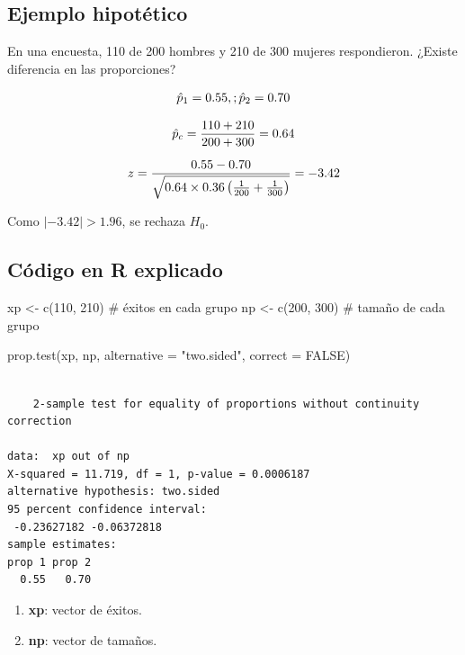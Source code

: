 \documentclass[
  spanish,
  letterpaper,
]{book}
\newenvironment{Shaded}{\begin{snugshade}}{\end{snugshade}}
\newcommand{\AttributeTok}[1]{\textcolor[rgb]{0.40,0.45,0.13}{#1}}
\newcommand{\CommentTok}[1]{\textcolor[rgb]{0.37,0.37,0.37}{#1}}
\newcommand{\ConstantTok}[1]{\textcolor[rgb]{0.56,0.35,0.01}{#1}}
\newcommand{\DecValTok}[1]{\textcolor[rgb]{0.68,0.00,0.00}{#1}}
\newcommand{\FunctionTok}[1]{\textcolor[rgb]{0.28,0.35,0.67}{#1}}
\newcommand{\NormalTok}[1]{\textcolor[rgb]{0.00,0.23,0.31}{#1}}
\newcommand{\OtherTok}[1]{\textcolor[rgb]{0.00,0.23,0.31}{#1}}
\newcommand{\StringTok}[1]{\textcolor[rgb]{0.13,0.47,0.30}{#1}}
\begin{document}
\subsection{Ejemplo hipotético}\label{ejemplo-hipotuxe9tico-2}

En una encuesta, 110 de 200 hombres y 210 de 300 mujeres respondieron.
¿Existe diferencia en las proporciones?

\[\LARGE \hat{p}_1 = 0.55,; \hat{p}_2 = 0.70\]

\[\LARGE \hat{p}_c = \frac{110+210}{200+300} = 0.64\]

\[\LARGE z = \frac{0.55 - 0.70}{\sqrt{0.64 \times 0.36 \left(\frac{1}{200} + \frac{1}{300}\right)}} = -3.42\]

Como \(|-3.42| > 1.96\), se rechaza \(H_0\).

\subsection{Código en R explicado}\label{cuxf3digo-en-r-explicado-4}

\begin{Shaded}
\begin{Highlighting}[]
\NormalTok{xp }\OtherTok{\textless{}{-}} \FunctionTok{c}\NormalTok{(}\DecValTok{110}\NormalTok{, }\DecValTok{210}\NormalTok{)   }\CommentTok{\# éxitos en cada grupo}
\NormalTok{np }\OtherTok{\textless{}{-}} \FunctionTok{c}\NormalTok{(}\DecValTok{200}\NormalTok{, }\DecValTok{300}\NormalTok{)   }\CommentTok{\# tamaño de cada grupo}

\FunctionTok{prop.test}\NormalTok{(xp, np,}
          \AttributeTok{alternative =} \StringTok{"two.sided"}\NormalTok{,}
          \AttributeTok{correct =} \ConstantTok{FALSE}\NormalTok{)}
\end{Highlighting}
\end{Shaded}

\begin{verbatim}

    2-sample test for equality of proportions without continuity correction

data:  xp out of np
X-squared = 11.719, df = 1, p-value = 0.0006187
alternative hypothesis: two.sided
95 percent confidence interval:
 -0.23627182 -0.06372818
sample estimates:
prop 1 prop 2 
  0.55   0.70 
\end{verbatim}

\begin{enumerate}
\def\labelenumi{\arabic{enumi}.}
\item
  \textbf{xp}: vector de éxitos.
\item
  \textbf{np}: vector de tamaños.
\end{enumerate}
\end{document}
